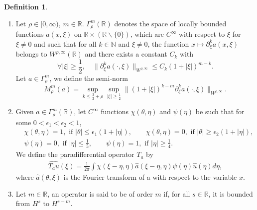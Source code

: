 \documentclass[12pt]{amsart}
\theoremstyle{definition}
\newtheorem{definition}[theorem]{Definition}
\numberwithin{equation}{section}
\begin{document}
\begin{definition}
\begin{enumerate}
\item Let $\rho\in [0,\infty)$, $m\in \mathbb{R}$. 
$\Gamma^m_\rho(\mathbb{R})$ denotes the space of locally bounded functions $a(x, \xi)$ on $\mathbb{R}\times (\mathbb{R}\backslash \{0\})$, which are $C^\infty$ with respect to $\xi$ for $\xi \neq 0$ and such that for all $k \in \mathbb{N}$ and $\xi \neq 0$, the function $x\mapsto \partial_\xi^k a(x,\xi)$ belongs to $W^{\rho,\infty}(\mathbb{R})$ and there exists a constant $C_k$ with
\begin{equation*}
\forall |\xi|\geq \frac{1}{2}, \quad \|\partial_\xi^k a(\cdot,\xi) \|_{W^{\rho,\infty}} \leq C_k (1+ |\xi|)^{m-k}.
\end{equation*}
Let $a\in \Gamma^m_\rho$,  we define the semi-norm
\begin{equation*}
M^m_{\rho}(a) = \sup_{k \leq \frac{3}{2}+\rho} \sup_{|\xi|\geq \frac{1}{2}} \|(1+ |\xi|)^{k-m}\partial_\xi^k a(\cdot,\xi)  \|_{W^{\rho,\infty}}.
\end{equation*}
\item Given $a\in \Gamma^m_\rho(\mathbb{R})$, let $C^\infty$ functions $\chi(\theta, \eta)$ and $\psi(\eta)$ be such that for some $0<\epsilon_1 < \epsilon_2<1$,
\begin{align*}
    &\chi(\theta, \eta) = 1,  \text{ if } |\theta| \leq \epsilon_1(1+ |\eta|), \qquad \chi(\theta, \eta) = 0,  \text{ if } |\theta| \geq \epsilon_2(1+ |\eta|),\\
    &\psi(\eta) = 0, \text{ if } |\eta|\leq \frac{1}{5}, \qquad \psi(\eta) =1, \text{ if } |\eta|\geq \frac{1}{4}.
\end{align*}
We define the paradifferential operator $T_a$ by
\begin{align*}
 \widehat{T_a u}(\xi) = \frac{1}{2\pi}\int \chi(\xi -\eta, \eta) \hat{a}(\xi-\eta, \eta)\psi(\eta)\hat{u}(\eta) d\eta,
\end{align*}
where $\hat{a}(\theta, \xi)$ is the Fourier transform of a with respect to the  variable $x$.

\item Let $m\in \mathbb{R}$, an operator  is said to be of order $m$ if, for all $s\in \mathbb{R}$, it is bounded from $H^s$ to $H^{s-m}$.
\end{enumerate}
\end{definition}
\end{document}
